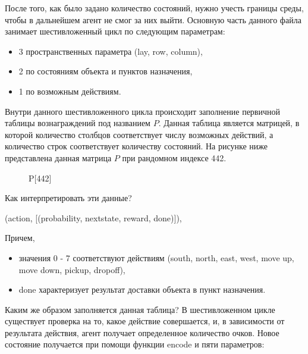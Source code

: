 \documentclass[a4paper]{report}
\theoremstyle{definition}
\theoremstyle{plain}
\theoremstyle{remark}
\theoremstyle{remark}
\theoremstyle{definition}
\begin{document}
После того, как было задано количество состояний, нужно учесть границы среды, чтобы в дальнейшем агент не смог за них выйти. Основную часть данного файла занимает шестивложенный цикл по следующим параметрам:
\begin{itemize}
    \item 3 пространственных параметра (lay, row, column),
    \item 2 по состояниям объекта и пунктов назначения,
    \item 1 по возможным действиям. 
\end{itemize}
Внутри данного шестивложенного цикла происходит заполнение первичной таблицы вознаграждений под названием $P$. Данная таблица является матрицей, в которой количество столбцов соответствует числу возможных действий, а количество строк соответствует количеству состояний. На рисунке ниже представлена данная матрица $P$ при рандомном индексе 442.
\begin{figure}[H]
	\caption{P[442]}
\end{figure}
Как интерпретировать эти данные?
\begin{center}
    (action, [(probability, nextstate, reward, done)]),
\end{center}
Причем, 
\begin{itemize}
    \item значения 0 - 7 соответствуют действиям (south, north, east, west, move up, move down, pickup, dropoff),
    \item done характеризует результат доставки объекта в пункт назначения.
\end{itemize}
Каким же образом заполняется данная таблица? В шестивложенном цикле существует проверка на то, какое действие совершается, и, в зависимости от результата действия, агент получает определенное количество очков. Новое состояние получается при помощи функции encode и пяти параметров:
\end{document}
